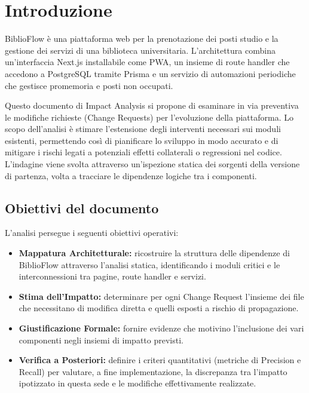 \documentclass[11pt,a4paper,oneside,openany]{book}
\begin{document}
\frontmatter
\copertina
\tableofcontents
\listoffigures
\listoftables

\mainmatter
\chapter{Introduzione}

BiblioFlow è una piattaforma web per la prenotazione dei posti studio e la
gestione dei servizi di una biblioteca universitaria. L'architettura combina
un'interfaccia Next.js installabile come PWA, un insieme di route handler che
accedono a PostgreSQL tramite Prisma e un servizio di automazioni periodiche
che gestisce promemoria e posti non occupati.

Questo documento di Impact Analysis si propone di esaminare in via preventiva
le modifiche richieste (Change Requests) per l'evoluzione della piattaforma.
Lo scopo dell'analisi è stimare l'estensione degli interventi necessari sui
moduli esistenti, permettendo così di pianificare lo sviluppo in modo accurato
e di mitigare i rischi legati a potenziali effetti collaterali o regressioni
nel codice. L'indagine viene svolta attraverso un'ispezione statica dei
sorgenti della versione di partenza, volta a tracciare le dipendenze logiche
tra i componenti.

\section{Obiettivi del documento}

L'analisi persegue i seguenti obiettivi operativi:
\begin{itemize}
  \item \textbf{Mappatura Architetturale:} ricostruire la struttura delle
        dipendenze di BiblioFlow attraverso l'analisi statica, identificando i
        moduli critici e le interconnessioni tra pagine, route handler e
        servizi.
  \item \textbf{Stima dell'Impatto:} determinare per ogni Change Request
        l'insieme dei file che necessitano di modifica diretta e quelli esposti
        a rischio di propagazione.
  \item \textbf{Giustificazione Formale:} fornire evidenze che motivino
        l'inclusione dei vari componenti negli insiemi di impatto previsti.
  \item \textbf{Verifica a Posteriori:} definire i criteri quantitativi
        (metriche di Precision e Recall) per valutare, a fine implementazione,
        la discrepanza tra l'impatto ipotizzato in questa sede e le modifiche
        effettivamente realizzate.
\end{itemize}
\end{document}
